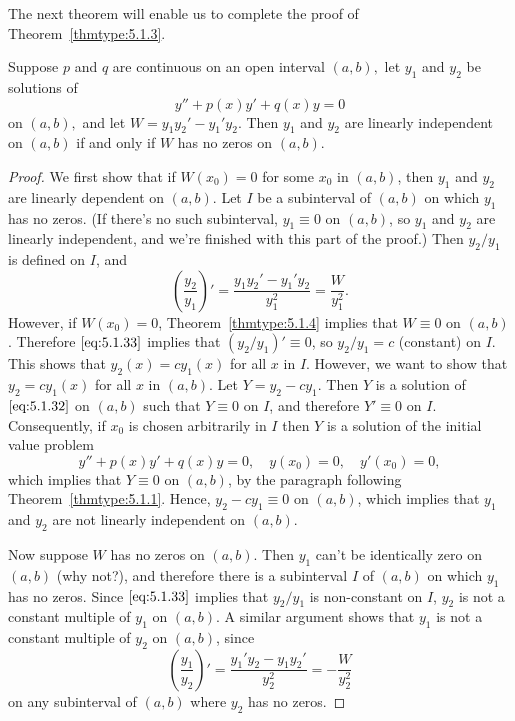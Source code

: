 \documentclass{ximera}
\begin{document}
 
 
The next theorem will enable us to complete the proof of
Theorem~\ref{thmtype:5.1.3}.
 
\begin{theorem}\label{thmtype:5.1.5}
 Suppose  $p$ and $q$ are continuous on an open interval $(a,b),$
 let $y_1$ and $y_2$ be solutions of
\begin{equation}\label{eq:5.1.32}
y''+p(x)y'+q(x)y=0
\end{equation}
on  $(a,b),$ and let $W=y_1y_2'-y_1'y_2.$
Then $y_1$ and $y_2$ are linearly independent on  $(a,b)$ if and only
if $W$ has no zeros on  $(a,b).$
\end{theorem}
 
\begin{proof}
We first show that if $W(x_0)=0$ for some $x_0$ in  $(a,b)$, then
$y_1$ and $y_2$ are linearly dependent on  $(a,b)$.  Let $I$ be a
subinterval
of  $(a,b)$ on which $y_1$ has no zeros. (If there's no such
subinterval, $y_1\equiv0$ on  $(a,b)$, so $y_1$ and $y_2$
are linearly independent, and we're finished with this part of the
proof.) Then $y_2/y_1$ is defined on $I$, and
\begin{equation}\label{eq:5.1.33}
\left(\frac{y_2}{y_1}\right)'=\frac{y_1y_2'-y_1'y_2}{y_1^2}=\frac{W}{y_1^2}.
\end{equation}
However, if $W(x_0)=0$,
 Theorem~\ref{thmtype:5.1.4} implies that $W\equiv0$ on  $(a,b)$.
Therefore $\eqref{eq:5.1.33}$ implies that  $(y_2/y_1)'\equiv0$, so
$y_2/y_1=c$ (constant) on $I$. This shows that $y_2(x)=cy_1(x)$
for all $x$ in $I$. However, we want to show that $y_2=cy_1(x)$
for all $x$ in  $(a,b)$.
Let $Y=y_2-cy_1$. Then $Y$ is a solution of $\eqref{eq:5.1.32}$
on  $(a,b)$ such that $Y\equiv0$ on $I$, and therefore $Y'\equiv0$ on
$I$. Consequently, if $x_0$  is chosen arbitrarily in  $I$ then
$Y$ is a solution of the initial value problem
$$
y''+p(x)y'+q(x)y=0,\quad y(x_0)=0,\quad y'(x_0)=0,
$$
which implies that $Y\equiv0$ on  $(a,b)$,
by the paragraph following
Theorem~\ref{thmtype:5.1.1}. %
 Hence, $y_2-cy_1\equiv0$
on  $(a,b)$, which implies that $y_1$ and $y_2$ are not linearly
independent on  $(a,b)$.
 
Now suppose   $W$ has no zeros on  $(a,b)$.  Then $y_1$
can't be identically zero on  $(a,b)$ (why not?), and therefore there
is a subinterval $I$ of  $(a,b)$ on which $y_1$ has no zeros. Since
$\eqref{eq:5.1.33}$ implies that $y_2/y_1$ is non-constant on $I$,
$y_2$ is not a constant multiple of $y_1$ on $(a,b)$.
A similar argument shows that $y_1$ is not a constant multiple of
$y_2$ on $(a,b)$, since
$$
\left(\frac{y_1}{y_2}\right)'=\frac{y_1'y_2-y_1y_2'}{y_2^2}=-\frac{W}{y_2^2}
$$
on any subinterval of $(a,b)$ where $y_2$ has no zeros.
\end{proof}
\end{document}
